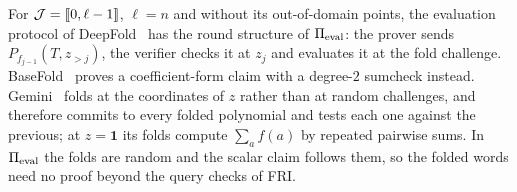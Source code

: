 \begin{remark}\label{rem:deepfold}
For $\mathcal{J} = \llbracket 0, \ell-1 \rrbracket$, $\ell = n$ and without its out-of-domain points, the evaluation protocol of DeepFold~\cite{GLHQTZ25} has the round structure of $\Pi_{\mathrm{eval}}$: the prover sends $P_{f_{j-1}}(T, z_{>j})$, the verifier checks it at $z_j$ and evaluates it at the fold challenge.
BaseFold~\cite{ZCF24} proves a coefficient-form claim with a degree-$2$ sumcheck instead.
Gemini~\cite{BCHO22} folds at the coordinates of $z$ rather than at random challenges, and therefore commits to every folded polynomial and tests each one against the previous; at $z = \mathbf 1$ its folds compute $\sum_a f(a)$ by repeated pairwise sums.
In $\Pi_{\mathrm{eval}}$ the folds are random and the scalar claim follows them, so the folded words need no proof beyond the query checks of FRI.
\end{remark}
